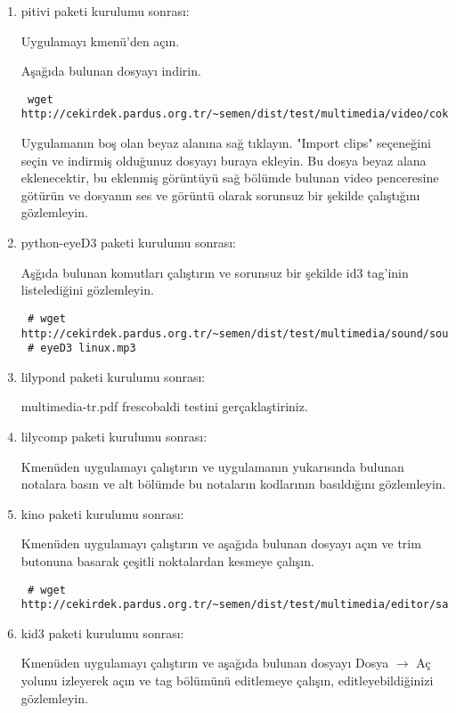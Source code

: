 \documentclass[a4paper,10pt]{article}
\begin{document}
\begin{enumerate}
\item pitivi paketi kurulumu sonrası:

Uygulamayı kmenü'den açın. 

Aşağıda bulunan dosyayı indirin. 
\begin{verbatim}
 wget http://cekirdek.pardus.org.tr/~semen/dist/test/multimedia/video/cokluortam/Lake_dance_XviD.AVI
\end{verbatim}

Uygulamanın boş olan beyaz alanına sağ tıklayın. "Import clips" seçeneğini seçin ve indirmiş olduğunuz dosyayı buraya ekleyin. Bu dosya beyaz alana eklenecektir, bu eklenmiş görüntüyü sağ bölümde bulunan video penceresine götürün ve dosyanın ses ve görüntü olarak sorunsuz bir şekilde çalıştığını gözlemleyin.

\item python-eyeD3 paketi kurulumu sonrası:

Aşğıda bulunan komutları çalıştırın ve sorunsuz bir şekilde id3 tag'inin listelediğini gözlemleyin.
\begin{verbatim}
 # wget http://cekirdek.pardus.org.tr/~semen/dist/test/multimedia/sound/sound/sample.mp3
 # eyeD3 linux.mp3 
\end{verbatim}

\item lilypond paketi kurulumu sonrası:

  multimedia-tr.pdf frescobaldi testini gerçaklaştiriniz.

\item lilycomp paketi kurulumu sonrası:
   
 Kmenüden uygulamayı çalıştırın ve uygulamanın yukarısında bulunan notalara basın ve alt bölümde bu notaların kodlarının basıldığını gözlemleyin.

\item kino paketi kurulumu sonrası:

  Kmenüden uygulamayı çalıştırın ve aşağıda bulunan dosyayı açın ve trim butonuna basarak çeşitli noktalardan kesmeye çalışın.
\begin{verbatim}
 # wget http://cekirdek.pardus.org.tr/~semen/dist/test/multimedia/editor/sample.dv
\end{verbatim}


\item kid3 paketi kurulumu sonrası:

Kmenüden uygulamayı çalıştırın ve aşağıda bulunan dosyayı Dosya $\rightarrow$ Aç yolunu izleyerek açın ve tag bölümünü editlemeye çalışın, editleyebildiğinizi gözlemleyin.


\end{enumerate}
\end{document}
